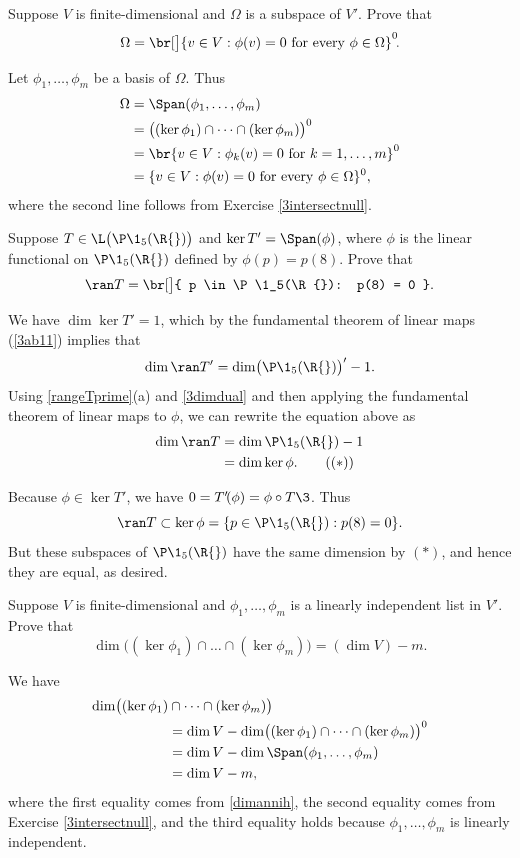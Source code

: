 \exercise
Suppose $V$ is finite-dimensional and $\Omega$ is a subspace of $V'\!$. Prove that
\[
\Omega = \br[\big]{v \in V: \phi(v) = 0 \text{\ for every } \phi \in \Omega}^0\!.
\]
\exercisedisplayend

\begin{Solution}
Let $\phi_1, \ldots, \phi_m$ be a basis of $\Omega$. Thus
\begin{align*}
\Omega &= \Span(\phi_1, \dots, \phi_m) \\
&= \bigl( (\ker \phi_1) \cap \dots \cap (\ker \phi_m)\bigr)^0 \\
&= \br{ v \in V: \phi_k(v) = 0 \text{ for } k = 1, \ldots, m}^0 \\
&= \{v \in V: \phi(v) = 0 \text{ for every } \phi \in \Omega\}^0,
 \end{align*}
 where the second line follows from Exercise \ref{3intersectnull}.
\end{Solution}

 \exercise
Suppose $T \in \L\bigl( \P\1_5(\R{}) \bigr)$ and $\ker T' = \Span(\phi)$, where $\phi$ is the linear functional on $\P\1_5(\R{})$ defined by $\phi(p) = p(8)$. Prove that
\[
\ran T = \br[\big]{ p \in \P\1_5(\R{}): p(8) = 0 }.
\]
\exercisedisplayend

\begin{Solution}
We have $\dim \ker T' = 1$, which by the fundamental theorem of linear maps (\ref{3ab11}) implies that
\[
\dim \ran T' = \dim \bigl( \P\1_5(\R{}) \bigr)' - 1.
\]
Using \ref{rangeTprime}(a) and \ref{3dimdual} and then applying the fundamental theorem of linear maps to $\phi$, we can rewrite the equation above as
\begin{align*}
\dim \ran T &= \dim \P\1_5(\R{}) - 1 \notag\\
&= \dim \ker \phi. \tag{$(*)$}
\end{align*}

Because $\phi \in \ker T'$, we have $0 = T' \! (\phi) = \phi \circ T\3$. Thus
\[
\ran T \subset \ker \phi = \{p \in \P\1_5(\R{}): p(8) = 0 \}.
\]
But these subspaces of $\P\1_5(\R{})$ have the same dimension by $(*)$, and hence they are equal, as desired.
\end{Solution}

\exercise
Suppose $V$ is finite-dimensional and $\phi_1, \dots, \phi_m$ is a linearly independent list in $V'\!$. Prove that \label{intker}
\[
\dim \bigl( (\ker \phi_1) \cap \dots \cap (\ker \phi_m)\bigr) = (\dim V) - m.
\]
\exercisedisplayend

\begin{Solution}
We have
\begin{align*}
\dim \bigl( (\ker \phi_1) &\cap \dots \cap (\ker \phi_m)\bigr) \\
&= \dim V - \dim \bigl( (\ker \phi_1) \cap \dots \cap (\ker \phi_m)\bigr)^0 \\
&= \dim V - \dim \Span(\phi_1, \dots, \phi_m) \\
&= \dim V - m,
\end{align*}
where the first equality comes from \ref{dimannih}, the second equality comes from Exercise \ref{3intersectnull}, and the third equality holds because $\phi_1, \dots, \phi_m$ is linearly independent.
\end{Solution}

